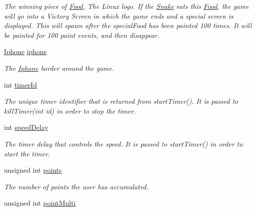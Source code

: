 \begin{DoxyCompactItemize}
\begin{DoxyCompactList}\small\item\em \-The winning piece of \hyperlink{classFood}{\-Food}, \-The \-Linux logo. \-If the \hyperlink{classSnake}{\-Snake} eats this \hyperlink{classFood}{\-Food}, the game will go into a \-Victory \-Screen in which the game ends and a special screen is displayed. \-This will spawn after the special\-Food has been painted 100 times. \-It will be painted for 100 paint events, and then disappear. \end{DoxyCompactList}\item 
\hypertarget{classGame_a096ce28dfd515112ffac0a6b25a7b969}{\hyperlink{classIphone}{\-Iphone} \hyperlink{classGame_a096ce28dfd515112ffac0a6b25a7b969}{iphone}}\label{classGame_a096ce28dfd515112ffac0a6b25a7b969}

\begin{DoxyCompactList}\small\item\em \-The \hyperlink{classIphone}{\-Iphone} border around the game. \end{DoxyCompactList}\item 
\hypertarget{classGame_aceecf6c9057f65306e5086644d3a621f}{int \hyperlink{classGame_aceecf6c9057f65306e5086644d3a621f}{timer\-Id}}\label{classGame_aceecf6c9057f65306e5086644d3a621f}

\begin{DoxyCompactList}\small\item\em \-The unique timer identifier that is returned from start\-Timer(). \-It is passed to kill\-Timer(int id) in order to stop the timer. \end{DoxyCompactList}\item 
\hypertarget{classGame_aba9da13645292bf746be23ea698c1919}{int \hyperlink{classGame_aba9da13645292bf746be23ea698c1919}{speed\-Delay}}\label{classGame_aba9da13645292bf746be23ea698c1919}

\begin{DoxyCompactList}\small\item\em \-The timer delay that controls the speed. \-It is passed to start\-Timer() in order to start the timer. \end{DoxyCompactList}\item 
\hypertarget{classGame_acf48e7c6cc26020e3cb205a0aebd63bd}{unsigned int \hyperlink{classGame_acf48e7c6cc26020e3cb205a0aebd63bd}{points}}\label{classGame_acf48e7c6cc26020e3cb205a0aebd63bd}

\begin{DoxyCompactList}\small\item\em \-The number of points the user has accumulated. \end{DoxyCompactList}\item 
\hypertarget{classGame_a937bcfe7d65bcec1849b70a1ed0f9b30}{unsigned int \hyperlink{classGame_a937bcfe7d65bcec1849b70a1ed0f9b30}{point\-Multi}}\label{classGame_a937bcfe7d65bcec1849b70a1ed0f9b30}


\end{DoxyCompactItemize}
